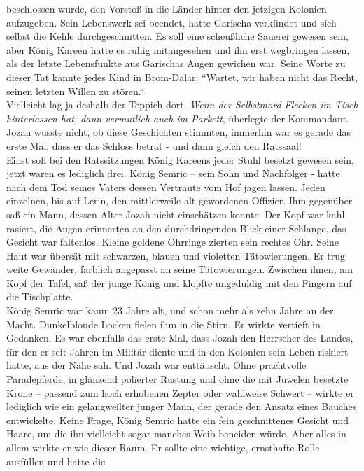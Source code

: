 beschlossen wurde, den Vorstoß in die Länder hinter den jetzigen Kolonien aufzugeben. Sein 
Lebenswerk sei beendet, hatte Garischa verkündet und sich selbst die Kehle durchgeschnitten. Es soll 
eine scheußliche Sauerei gewesen sein, aber König Kareen hatte es ruhig mitangesehen und ihn 
erst wegbringen lassen, als der letzte Lebensfunkte aus Garischas Augen gewichen war. Seine Worte zu 
dieser Tat kannte jedes Kind in Brom-Dalar: ``Wartet, wir haben nicht das Recht, seinen letzten 
Willen zu stören.``\\ 
Vielleicht lag ja deshalb der Teppich dort. \textit{Wenn der Selbstmord Flecken im Tisch 
hinterlassen hat, dann vermutlich auch im Parkett}, überlegte der Kommandant.\\
Jozah wusste nicht, ob diese Geschichten stimmten, immerhin war es gerade das erste Mal, dass er das 
Schloss betrat - und dann gleich den Ratssaal!\\
Einst soll bei den Ratssitzungen König Kareens jeder Stuhl besetzt gewesen sein, jetzt waren es 
lediglich drei. König Semric – sein Sohn und Nachfolger - hatte nach dem Tod seines Vaters dessen 
Vertraute vom Hof jagen lassen. Jeden einzelnen, bis auf Lerin, den mittlerweile alt gewordenen 
Offizier. Ihm gegenüber saß ein Mann, dessen Alter Jozah nicht einschätzen konnte. Der Kopf war 
kahl rasiert, die Augen erinnerten an den durchdringenden Blick einer Schlange, das Gesicht war 
faltenlos. Kleine goldene Ohrringe zierten sein rechtes Ohr. Seine Haut war übersät mit schwarzen, 
blauen und violetten Tätowierungen. Er trug weite Gewänder, farblich angepasst an seine 
Tätowierungen. Zwischen ihnen, am Kopf der Tafel, saß der junge König und klopfte ungeduldig mit 
den Fingern auf die Tischplatte. \\
König Semric war kaum 23 Jahre alt, und schon mehr als zehn Jahre an der Macht. Dunkelblonde Locken 
fielen ihm in die Stirn. Er wirkte vertieft in Gedanken. Es war ebenfalls das erste Mal, dass Jozah 
den Herrscher des Landes, für den er seit Jahren im Militär diente und in den Kolonien sein Leben 
riskiert hatte, aus der Nähe sah. Und Jozah war enttäuscht. Ohne prachtvolle Paradepferde, in 
glänzend polierter Rüstung und ohne die mit Juwelen besetzte Krone – passend zum hoch erhobenen 
Zepter oder wahlweise Schwert – wirkte er lediglich wie ein gelangweilter junger Mann, der gerade 
den Ansatz eines Bauches entwickelte. Keine Frage, König Semric hatte ein fein geschnittenes 
Gesicht und Haare, um die ihn vielleicht sogar manches Weib beneiden würde. Aber alles in allem 
wirkte er wie dieser Raum. Er sollte eine wichtige, ernsthafte Rolle ausfüllen und hatte die 
